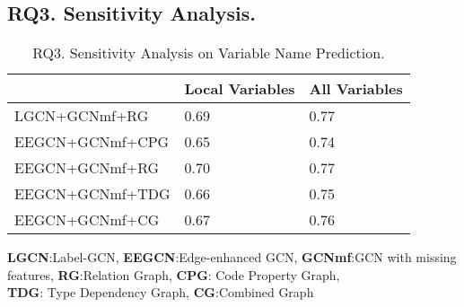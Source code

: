 \subsection{{\bf RQ3. Sensitivity Analysis.}}
\label{empirical-rq3}



\begin{table}[t]
	\caption{RQ3. Sensitivity Analysis on Variable Name Prediction.}
	\begin{center}
		\small
		\renewcommand{\arraystretch}{1} 
		\begin{tabular}{p{2.5cm}<{\centering}|p{2cm}<{\centering}|p{2cm}<{\centering}}
			\hline
			                    & Local Variables & All Variables\\
			\hline
			LGCN+GCNmf+RG       & 0.69            & 0.77    \\
			EEGCN+GCNmf+CPG     & 0.65            & 0.74    \\
			EEGCN+GCNmf+RG      & 0.70            & 0.77    \\
			EEGCN+GCNmf+TDG     & 0.66            & 0.75    \\
			EEGCN+GCNmf+CG      & 0.67            & 0.76    \\
			\hline
		\end{tabular}
		\label{RQ3-result-1}
		{\bf LGCN}:Label-GCN, {\bf EEGCN}:Edge-enhanced GCN, {\bf GCNmf}:GCN with missing features, {\bf RG}:Relation Graph, {\bf CPG}: Code Property Graph, \\{\bf TDG}: Type Dependency Graph, {\bf CG}:Combined Graph
	\end{center}
\end{table}

